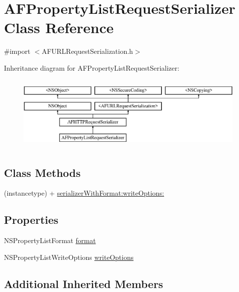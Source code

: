 \hypertarget{interface_a_f_property_list_request_serializer}{}\section{A\+F\+Property\+List\+Request\+Serializer Class Reference}
\label{interface_a_f_property_list_request_serializer}


{\ttfamily \#import $<$A\+F\+U\+R\+L\+Request\+Serialization.\+h$>$}

Inheritance diagram for A\+F\+Property\+List\+Request\+Serializer\+:\begin{figure}[H]
\begin{center}
\leavevmode
\includegraphics[height=3.678161cm]{interface_a_f_property_list_request_serializer}
\end{center}
\end{figure}
\subsection*{Class Methods}
\begin{DoxyCompactItemize}
\item 
(instancetype) + \hyperlink{interface_a_f_property_list_request_serializer_abd5f5e201b54bb0d2982c937b5f494f4}{serializer\+With\+Format\+:write\+Options\+:}
\end{DoxyCompactItemize}
\subsection*{Properties}
\begin{DoxyCompactItemize}
\item 
N\+S\+Property\+List\+Format \hyperlink{interface_a_f_property_list_request_serializer_a7caf5c4c62553db952c3f8dca8cf5b5f}{format}
\item 
N\+S\+Property\+List\+Write\+Options \hyperlink{interface_a_f_property_list_request_serializer_a15d74e1c93bc158815a46aa351e6fb79}{write\+Options}
\end{DoxyCompactItemize}
\subsection*{Additional Inherited Members}


